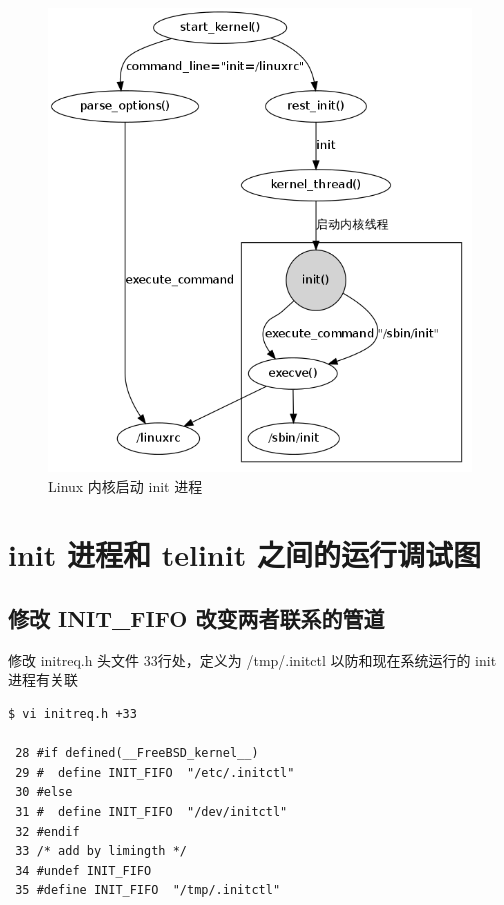 \begin{figure}[htbp]
\centering
\includegraphics{./figures/kernel2init.png}
\caption{Linux 内核启动 init 进程}
\end{figure}

\section{init 进程和 telinit 之间的运行调试图}

\subsection{修改 INIT\_FIFO 改变两者联系的管道}

修改 initreq.h 头文件 33行处，定义为 /tmp/.initctl 以防和现在系统运行的
init 进程有关联

{\begin{shaded}\begin{verbatim}
$ vi initreq.h +33

 28 #if defined(__FreeBSD_kernel__)
 29 #  define INIT_FIFO  "/etc/.initctl"
 30 #else
 31 #  define INIT_FIFO  "/dev/initctl"
 32 #endif
 33 /* add by limingth */
 34 #undef INIT_FIFO
 35 #define INIT_FIFO  "/tmp/.initctl"
\end{verbatim}\end{shaded}}
